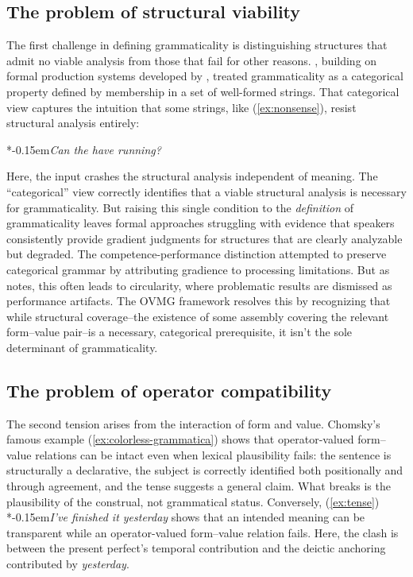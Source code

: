 \documentclass[12pt,letterpaper]{article}
\newcommand{\mention}[1]{\textit{#1}}
\newcommand{\judgesep}{\kern-0.15em}
\newcommand{\ungram}[1]{*\judgesep#1}
\begin{document}
\subsection{The problem of structural viability}\label{sec:impasse-viability}

The first challenge in defining grammaticality is distinguishing structures that admit no viable analysis from those that fail for other reasons. \textcite{chomsky1957}, building on formal production systems developed by \textcite{post1943}, treated grammaticality as a categorical property defined by membership in a set of well-formed strings. That categorical view captures the intuition that some strings, like (\ref{ex:nonsense}), resist structural analysis entirely:

\ea
\ungram{\mention{Can the have running?}}
\z

Here, the input crashes the structural analysis independent of meaning. The \enquote{categorical} view correctly identifies that a viable structural analysis is necessary for grammaticality. But raising this single condition to the \emph{definition} of grammaticality leaves formal approaches struggling with evidence that speakers consistently provide gradient judgments for structures that are clearly analyzable but degraded. The competence-performance distinction \autocite{chomsky1965} attempted to preserve categorical grammar by attributing gradience to processing limitations. But as \textcite[71]{schutze2016} notes, this often leads to circularity, where problematic results are dismissed as performance artifacts. The OVMG framework resolves this by recognizing that while structural coverage--the existence of some assembly covering the relevant form--value pair--is a necessary, categorical prerequisite, it isn't the sole determinant of grammaticality.

\subsection{The problem of operator compatibility}\label{sec:impasse-coherence}

The second tension arises from the interaction of form and value. Chomsky's famous example (\ref{ex:colorless-grammatica}) shows that operator-valued form--value relations can be intact even when lexical plausibility fails: the sentence is structurally a declarative, the subject is correctly identified both positionally and through agreement, and the tense suggests a general claim. What breaks is the plausibility of the construal, not grammatical status. Conversely, (\ref{ex:tense}) \ungram{\mention{I've finished it yesterday}} shows that an intended meaning can be transparent while an operator-valued form--value relation fails. Here, the clash is between the present perfect's temporal contribution and the deictic anchoring contributed by \mention{yesterday}.
\end{document}

